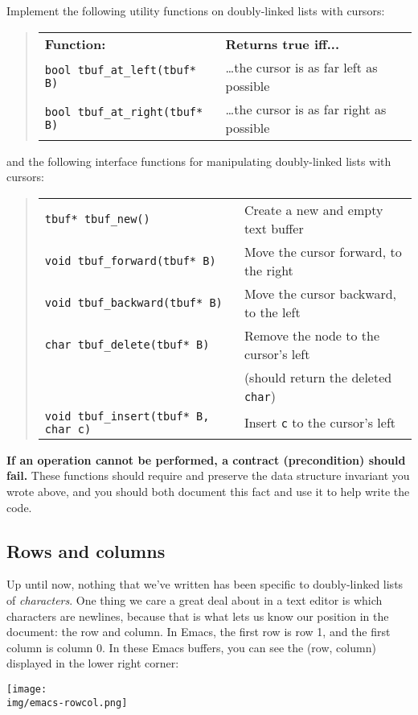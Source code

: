 \documentclass[12pt]{exam}
\begin{document}
\begin{task}[9]
Implement the following utility functions on doubly-linked lists with cursors:

\begin{quote}
\begin{tabular}{p{}p{}}
    \textbf{Function:}             & \textbf{Returns true iff...} \\
    \lstinline"bool tbuf_at_left(tbuf* B)"
      & \ldots{t}he cursor is as far left as possible \\
    \lstinline"bool tbuf_at_right(tbuf* B)"
      & \ldots{t}he cursor is as far right as possible \\
\end{tabular}
\end{quote}

\noindent
and the following interface functions for manipulating doubly-linked
lists with cursors:

\begin{quote}
\begin{tabular}{p{}p{}}
 \lstinline"tbuf* tbuf_new()" & Create a new and empty text buffer \\
 \lstinline"void tbuf_forward(tbuf* B)" & Move the cursor forward, to the right \\
 \lstinline"void tbuf_backward(tbuf* B)" & Move the cursor backward, to the left \\
 \lstinline"char tbuf_delete(tbuf* B)" & Remove the node to the cursor's left \\
 & (should return the deleted \lstinline'char') \\
 \lstinline"void tbuf_insert(tbuf* B, char c)" & Insert \lstinline'c' to the cursor's left \\
\end{tabular}
\end{quote}
\end{task}
\noindent
\textbf{If an operation cannot be performed, a contract
(precondition) should
fail.}
These functions should require and preserve the data structure
invariant you wrote above, and you should both document this fact and
use it to help write the code.

\subsection{Rows and columns}

Up until now, nothing that we've written has been specific to
doubly-linked lists of \emph{characters}. One thing we care a great
deal about in a text editor is which characters are newlines, because
that is what lets us know our position in the document: the row and
column. In Emacs, the first row is row 1, and the first column is
column 0. In these Emacs buffers, you can see the (row,
column) displayed in the lower right corner:
\begin{center}
  \texttt{[image: \\img/emacs-rowcol.png]}
\end{center}
\end{document}
